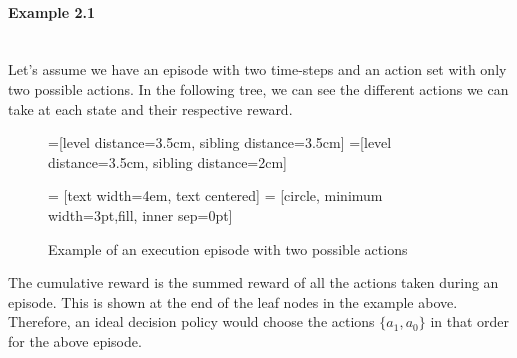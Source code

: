 \paragraph{Example 2.1}\mbox{}\\
Let's assume we have an episode with two time-steps and an action set with only two possible actions. In the following tree, we can see the different actions we can take at each state and their respective reward.\\
\begin{figure}[h]
=[level distance=3.5cm, sibling distance=3.5cm]
=[level distance=3.5cm, sibling distance=2cm]

 = [text width=4em, text centered]
 = [circle, minimum width=3pt,fill, inner sep=0pt]

\begin{center}
	
\caption{Example of an execution episode with two possible actions}
\end{center}
\end{figure}

The cumulative reward is the summed reward of all the actions taken during an episode. This is shown at the end of the leaf nodes in the example above. Therefore, an ideal decision policy would choose the actions $\{a_1,a_0\}$ in that order for the above episode.
